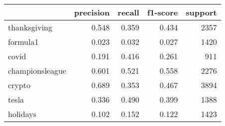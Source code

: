 \begin{tabular}{lrrrr}
\toprule
{} &  precision &  recall &  f1-score &  support \\
\midrule
thanksgiving    &      0.548 &   0.359 &     0.434 &     2357 \\
formula1        &      0.023 &   0.032 &     0.027 &     1420 \\
covid           &      0.191 &   0.416 &     0.261 &      911 \\
championsleague &      0.601 &   0.521 &     0.558 &     2276 \\
crypto          &      0.689 &   0.353 &     0.467 &     3894 \\
tesla           &      0.336 &   0.490 &     0.399 &     1388 \\
holidays        &      0.102 &   0.152 &     0.122 &     1423 \\
\bottomrule
\end{tabular}
